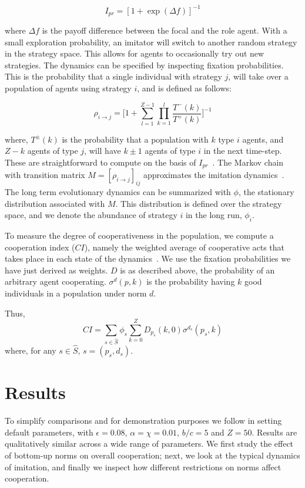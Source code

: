 \documentclass[sigconf]{aamas}  %
\begin{document}
$$I_{pr} = [1 + \exp( \Delta f )]^{-1}$$

\noindent where $\Delta f$ is the payoff difference between the focal and the role agent. With a small exploration probability, an imitator will switch to another random strategy in the strategy space. This allows for agents to occasionally try out new strategies. The dynamics can be specified by inspecting fixation probabilities. This is the probability that a single individual with strategy $j$, will take over a population of agents using strategy $i$, and is defined as follows:

$$\rho_{i \to j} = \Big[1+ \sum_{l=1}^{Z-1} \prod_{k=1}^{l} \frac{T^{-}(k)}{T^{+}(k)}\Big]^{-1}$$

\noindent where, $T^{\pm}(k)$ is the probability that a population with $k$ type $i$ agents, and $Z-k$ agents of type $j$, will have $k \pm 1$ agents of type $i$ in the next time-step. These are straightforward to compute on the basis of $I_{pr}$~\cite{traulsen:bookchapter:2009}. The Markov chain with transition matrix $M = [\rho_{i \to j}]_{ij}$ approximates the imitation dynamics~\cite{fudenberg:JET:2006}.  The long term evolutionary dynamics can be summarized with $\phi$, the stationary distribution associated with $M$.  This distribution is defined over the strategy space, and we denote the abundance of strategy $i$ in the long run,  $\phi_i$.

To measure the degree of cooperativeness in the population, we  compute a cooperation index ($CI$), namely the weighted average of cooperative acts that takes place in each state of the dynamics~\cite{Santos2016}. We use the fixation probabilities we have just derived as weights. $D$ is as described above, the probability of an arbitrary agent cooperating. $\sigma^{d}(p,k)$ is the probability having $k$ good individuals in a population under norm $d$.

Thus, 
\[CI = \sum_{s \in \hat{S}} \phi_{s}\sum_{k=0}^{Z}D_{p_s}(k,0) \sigma^{d_s}(p_s,k)\]
where, for any $s \in \hat{S}$, $s = (p_s, d_s)$.

\section{Results\label{results}}

To simplify comparisons and for demonstration purposes we follow \cite{Santos2016} in setting default parameters, with $\epsilon=0.08$, $\alpha = \chi = 0.01$, $b/c = 5$ and $Z=50$. Results are qualitatively similar across a wide range of parameters. We first study the effect of bottom-up norms on overall cooperation; next, we look at the typical dynamics of imitation, and finally we inspect how different restrictions on norms affect cooperation. 
\end{document}
